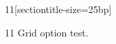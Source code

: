 \documentclass[paper=A4]{ropas-poster}
\begin{document}
\begin{postergrid}{1}{1}[sectiontitle-size=25bp]
\begin{posterblock}{1}{1}
Grid option test.
\end{posterblock}
\end{postergrid}
\end{document}
